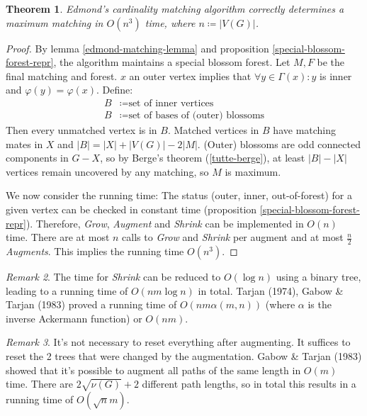 \documentclass[11pt, a4paper]{article}
\newcommand{\abs}[1]{\left\lvert#1\right\rvert}
\newtheorem{theorem}{Theorem}[section]
\theoremstyle{remark}
\newtheorem{remark}[theorem]{Remark}
\theoremstyle{definition}
\begin{document}
\begin{theorem}\label{thm:edmonds-matching-alg}
Edmond's cardinality matching algorithm correctly determines a maximum
matching in $O(n^3)$ time, where $n\coloneqq\abs{V(G)}$.
\end{theorem}
\begin{proof}
By lemma \ref{edmond-matching-lemma} and proposition
\ref{special-blossom-forest-repr}, the algorithm maintains a special
blossom forest. Let $M,F$ be the final matching and forest. $x$ an outer
vertex implies that $\forall y\in\Gamma(x): y$ is inner and $\varphi(y)=\varphi(x)$.
Define:
\begin{align*}
	B&\coloneqq \text{set of inner vertices} \\
	B&\coloneqq \text{set of bases of (outer) blossoms}
\end{align*}
Then every unmatched vertex is in $B$. Matched vertices in $B$ have
matching mates in $X$ and $\abs{B}=\abs{X}+\abs{V(G)}-2\abs{M}$. (Outer)
blossoms are odd connected components in $G-X$, so by Berge's theorem
(\ref{tutte-berge}), at least $\abs{B}-\abs{X}$ vertices remain uncovered
by any matching, so $M$ is maximum.

We now consider the running time: The status (outer, inner, out-of-forest)
for a given vertex can be checked in constant time (proposition
\ref{special-blossom-forest-repr}). Therefore, \emph{Grow}, \emph{Augment}
and \emph{Shrink} can be implemented in $O(n)$ time. There are at most
$n$ calls to \emph{Grow} and \emph{Shrink} per augment and at most
$\frac{n}{2}$ \emph{Augments}. This implies the running time $O(n^3)$.
\end{proof}

\begin{remark}
The time for \emph{Shrink} can be reduced to $O(\log n)$ using a binary
tree, leading to a running time of $O(nm\log n)$ in total. Tarjan (1974),
Gabow \& Tarjan (1983) proved a running time of $O(nm\alpha(m,n))$ (where
$\alpha$ is the inverse Ackermann function) or $O(nm)$.
\end{remark}

\begin{remark}
It's not necessary to reset everything after augmenting. It suffices to
reset the 2 trees that were changed by the augmentation. Gabow \& Tarjan
(1983) showed that it's possible to augment all paths of the same length in
$O(m)$ time. There are $2\sqrt{\nu(G)}+2$ different path lengths, so
in total this results in a running time of $O(\sqrt{n}m)$.
\end{remark}
\end{document}
